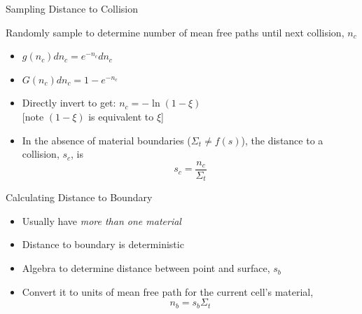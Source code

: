 \documentclass[xcolor=x11names,compress,handout]{beamer}
\renewcommand{\(}{\begin{columns}}
\renewcommand{\)}{\end{columns}}
\newcommand{\<}[1]{\begin{column}{#1}}
\renewcommand{\>}{\end{column}}
\begin{document}
\begin{frame}{Sampling Distance to Collision}

Randomly sample to determine number of mean free paths until next collision, $n_c$

\begin{itemize}
  \item $g(n_c) dn_c = e^{-n_c} dn_c$ 
  \vspace{.5em}
  \item $G(n_c) dn_c = 1 - e^{-n_c}$ 
  \vspace{.5em}
  \item Directly invert to get: $\boxed{n_c = - \ln(1 - \xi)}$ \\
   \hspace*{1.5em} [note $(1-\xi)$ is equivalent to $\xi$]
  \vspace{.5em}
  \item In the absence of material boundaries ($\Sigma_t \neq f(s)$), the distance to a collision, $s_c$, is
  \[s_c = \frac{n_c}{\Sigma_t}\]
\end{itemize}

\end{frame}


\begin{frame}{Calculating Distance to Boundary}

\begin{itemize}
  \item Usually have \textit{more than one material}
  \vspace*{1 em}
  \item Distance to boundary is deterministic
  \vspace*{1 em}
  \item Algebra to determine distance between point and surface, $s_b$
  \vspace*{1 em}
  \item Convert it to units of mean free path for the current cell's material, 
  \[n_b = s_b \Sigma_t\] 
\end{itemize}

\end{frame}
\end{document}
